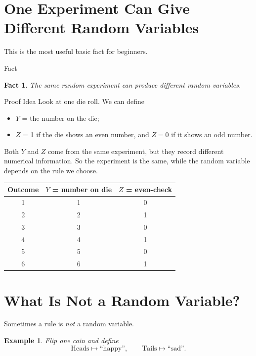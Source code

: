 \documentclass[11pt,a4paper]{article}
\newtheorem{fact}[definition]{Fact}
\newtheorem{example}[definition]{Example}
\begin{document}
\section{One Experiment Can Give Different Random Variables}

This is the most useful basic fact for beginners.

\begin{mathblock}{Fact}
\begin{fact}
The same random experiment can produce different random variables.
\end{fact}
\end{mathblock}

\begin{mathblock}{Proof Idea}
Look at one die roll.
We can define
\begin{itemize}
  \item \(Y\) = the number on the die;
  \item \(Z\) = 1 if the die shows an even number, and \(Z=0\) if it shows an odd number.
\end{itemize}
Both \(Y\) and \(Z\) come from the same experiment, but they record different numerical information.
So the experiment is the same, while the random variable depends on the rule we choose.
\end{mathblock}

\begin{center}
\begin{tabular}{c c c}
\toprule
Outcome & \(Y\) = number on die & \(Z\) = even-check \\
\midrule
1 & 1 & 0 \\
2 & 2 & 1 \\
3 & 3 & 0 \\
4 & 4 & 1 \\
5 & 5 & 0 \\
6 & 6 & 1 \\
\bottomrule
\end{tabular}
\end{center}

\section{What Is Not a Random Variable?}

Sometimes a rule is \emph{not} a random variable.

\begin{example}
Flip one coin and define
\[
\text{Heads} \mapsto \text{``happy''}, \qquad
\text{Tails} \mapsto \text{``sad''}.
\]
\end{example}
\end{document}
